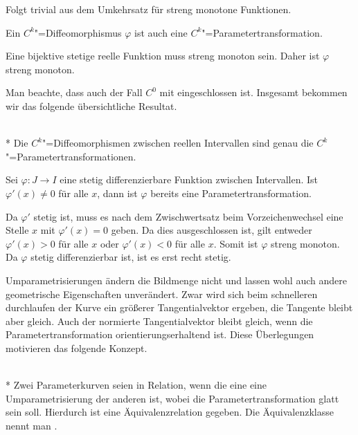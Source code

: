 \noindent{}
Folgt trivial aus dem Umkehrsatz für streng monotone
Funktionen.\;\qedsymbol

\begin{corollary}
Ein $C^k$"=Diffeomorphismus $\varphi$ ist auch eine
$C^k$"=Parametertransformation.
\end{corollary}

\noindent{}
Eine bijektive stetige reelle Funktion muss streng monoton sein.
Daher ist $\varphi$ streng monoton.\;\qedsymbol

Man beachte, dass auch der Fall $C^0$ mit eingeschlossen ist.
Insgesamt bekommen wir das folgende übersichtliche Resultat.

\begin{corollary}\mbox{}\\*
Die $C^k$"=Diffeomorphismen zwischen reellen Intervallen sind
genau die $C^k$"=Parametertransformationen.
\end{corollary}

\begin{corollary}
Sei $\varphi\colon J\to I$ eine stetig differenzierbare
Funktion zwischen Intervallen. Ist $\varphi'(x)\ne 0$ für alle $x$,
dann ist $\varphi$ bereits eine Parametertransformation.
\end{corollary}

\noindent{}
Da $\varphi'$ stetig ist, muss es nach dem Zwischwertsatz beim
Vorzeichenwechsel eine Stelle $x$ mit $\varphi'(x)=0$ geben. Da
dies ausgeschlossen ist, gilt entweder $\varphi'(x)>0$ für alle $x$
oder $\varphi'(x)<0$ für alle $x$. Somit ist $\varphi$ streng monoton.
Da $\varphi$ stetig differenzierbar ist, ist es erst recht
stetig.\;\qedsymbol

Umparametrisierungen ändern die Bildmenge nicht und lassen wohl auch
andere geometrische Eigenschaften unverändert. Zwar wird sich
beim schnelleren durchlaufen der Kurve ein größerer Tangentialvektor
ergeben, die Tangente bleibt aber gleich. Auch der normierte
Tangentialvektor bleibt gleich, wenn die Parametertransformation
orientierungserhaltend ist. Diese Überlegungen motivieren das folgende
Konzept.

\begin{definition}\mbox{}\\*
Zwei Parameterkurven seien in Relation, wenn die eine eine
Umparametrisierung der anderen ist, wobei die Parametertransformation
glatt sein soll. Hierdurch ist eine 
Äquivalenzrelation gegeben. Die Äquivalenzklasse nennt man
.
\end{definition}

